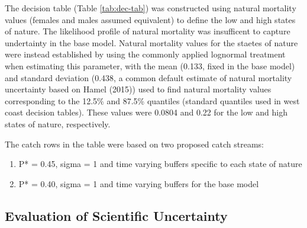 \documentclass[11pt,
  english,
  a4paper,
]{article}
\begin{document}
\leavevmode\tagmcend\tagstructend\par


The decision table (Table \ref{tab:dec-tab}) was constructed using natural mortality values (females and males assumed equivalent) to define the low and high states of nature. The likelihood profile of natural mortality was insufficent to capture undertainty in the base model. Natural mortality values for the staetes of nature were instead established by using the commonly applied lognormal treatment when estimating this parameter, with the mean (0.133, fixed in the base model) and standard deviation (0.438, a common default estimate of natural mortality uncertainty based on Hamel (2015)) used to find natural mortality values corresponding to the 12.5\% and 87.5\% quantiles (standard quantiles used in west coast decision tables). These values were 0.0804 and 0.22 for the low and high states of nature, respectively.

\leavevmode\tagmcend\tagstructend\par


The catch rows in the table were based on two proposed catch streams:

\leavevmode\tagmcend\tagstructend\par


\begin{enumerate}
\def\labelenumi{\arabic{enumi}.}
\item

  P* = 0.45, sigma = 1 and time varying buffers specific to each state of nature

  \tagmcend\tagstructend\tagstructend
\item

  P* = 0.40, sigma = 1 and time varying buffers for the base model

  \tagmcend\tagstructend\tagstructend
\end{enumerate}

\tagstructend


\hypertarget{evaluation-of-scientific-uncertainty}{%
\subsection{Evaluation of Scientific Uncertainty}\label{evaluation-of-scientific-uncertainty}}
\end{document}
